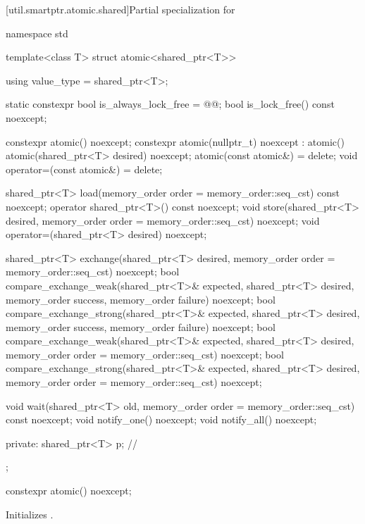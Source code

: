 [util.smartptr.atomic.shared]{Partial specialization for }
%
\begin{codeblock}
namespace std {
  template<class T> struct atomic<shared_ptr<T>> {
    using value_type = shared_ptr<T>;

    static constexpr bool is_always_lock_free = @@;
    bool is_lock_free() const noexcept;

    constexpr atomic() noexcept;
    constexpr atomic(nullptr_t) noexcept : atomic() { }
    atomic(shared_ptr<T> desired) noexcept;
    atomic(const atomic&) = delete;
    void operator=(const atomic&) = delete;

    shared_ptr<T> load(memory_order order = memory_order::seq_cst) const noexcept;
    operator shared_ptr<T>() const noexcept;
    void store(shared_ptr<T> desired, memory_order order = memory_order::seq_cst) noexcept;
    void operator=(shared_ptr<T> desired) noexcept;

    shared_ptr<T> exchange(shared_ptr<T> desired,
                           memory_order order = memory_order::seq_cst) noexcept;
    bool compare_exchange_weak(shared_ptr<T>& expected, shared_ptr<T> desired,
                               memory_order success, memory_order failure) noexcept;
    bool compare_exchange_strong(shared_ptr<T>& expected, shared_ptr<T> desired,
                                 memory_order success, memory_order failure) noexcept;
    bool compare_exchange_weak(shared_ptr<T>& expected, shared_ptr<T> desired,
                               memory_order order = memory_order::seq_cst) noexcept;
    bool compare_exchange_strong(shared_ptr<T>& expected, shared_ptr<T> desired,
                                 memory_order order = memory_order::seq_cst) noexcept;

    void wait(shared_ptr<T> old, memory_order order = memory_order::seq_cst) const noexcept;
    void notify_one() noexcept;
    void notify_all() noexcept;

  private:
    shared_ptr<T> p;            // \expos
  };
}
\end{codeblock}

%
\begin{itemdecl}
constexpr atomic() noexcept;
\end{itemdecl}

\begin{itemdescr}
\pnum
\effects
Initializes .
\end{itemdescr}

